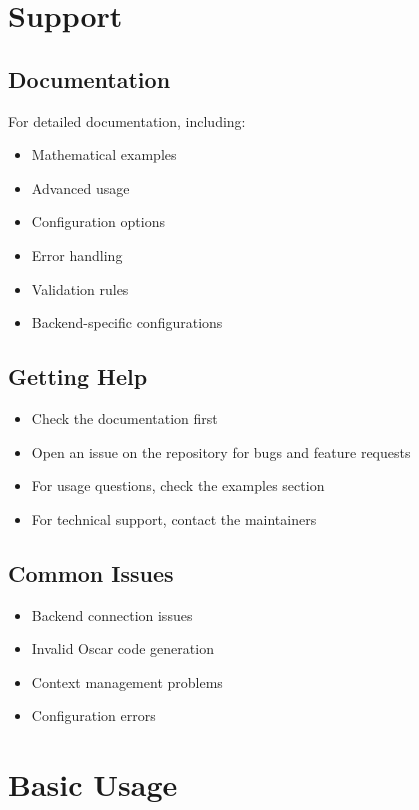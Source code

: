\documentclass[11pt,a4paper]{article}
\begin{document}
\section{Support}
\label{sec:support}

\subsection{Documentation}
For detailed documentation, including:
\begin{itemize}
    \item Mathematical examples
    \item Advanced usage
    \item Configuration options
    \item Error handling
    \item Validation rules
    \item Backend-specific configurations
\end{itemize}

\subsection{Getting Help}
\begin{itemize}
    \item Check the documentation first
    \item Open an issue on the repository for bugs and feature requests
    \item For usage questions, check the examples section
    \item For technical support, contact the maintainers
\end{itemize}

\subsection{Common Issues}
\begin{itemize}
    \item Backend connection issues
    \item Invalid Oscar code generation
    \item Context management problems
    \item Configuration errors
\end{itemize}



\section{Basic Usage}
\label{sec:basic_usage}
\end{document}
